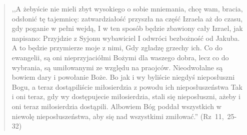 \documentclass[10pt,a4paper,oneside]{article}
\begin{document}
\begin{quote}
,,A żebyście nie mieli zbyt wysokiego o sobie mniemania, chcę wam, bracia, odsłonić tę tajemnicę: zatwardziałość przyszła na część Izraela aż do czasu, gdy poganie w pełni wejdą, I w ten sposób będzie zbawiony cały Izrael, jak napisano: Przyjdzie z Syjonu wybawiciel I odwróci bezbożność od Jakuba. A to będzie przymierze moje z nimi, Gdy zgładzę grzechy ich. Co do ewangelii, są oni nieprzyjaciółmi Bożymi dla waszego dobra, lecz co do wybrania, są umiłowanymi ze względu na praojców. Nieodwołalne są bowiem dary i powołanie Boże. Bo jak i wy byliście niegdyś nieposłuszni Bogu, a teraz dostąpiliście miłosierdzia z powodu ich nieposłuszeństwa Tak i oni teraz, gdy wy dostępujecie miłosierdzia, stali się nieposłuszni, ażeby i oni teraz miłosierdzia dostąpili. Albowiem Bóg poddał wszystkich w niewolę nieposłuszeństwa, aby się nad wszystkimi zmiłować.'' (Rz~11,~25-32)
\end{quote}
\end{document}

